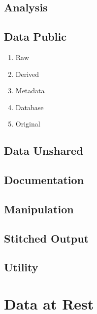 \documentclass[]{book}
\providecommand{\tightlist}{%
  \setlength{\itemsep}{0pt}\setlength{\parskip}{0pt}}
\begin{document}
\hypertarget{analysis}{%
\section{Analysis}\label{analysis}}

\hypertarget{data-public}{%
\section{Data Public}\label{data-public}}

\begin{enumerate}
\def\labelenumi{\arabic{enumi}.}
\tightlist
\item
  Raw
\item
  Derived
\item
  Metadata
\item
  Database
\item
  Original
\end{enumerate}

\hypertarget{data-unshared}{%
\section{Data Unshared}\label{data-unshared}}

\hypertarget{documentation}{%
\section{Documentation}\label{documentation}}

\hypertarget{manipulation}{%
\section{Manipulation}\label{manipulation}}

\hypertarget{stitched-output}{%
\section{Stitched Output}\label{stitched-output}}

\hypertarget{utility}{%
\section{Utility}\label{utility}}

\hypertarget{data-at-rest}{%
\chapter{Data at Rest}\label{data-at-rest}}
\end{document}
